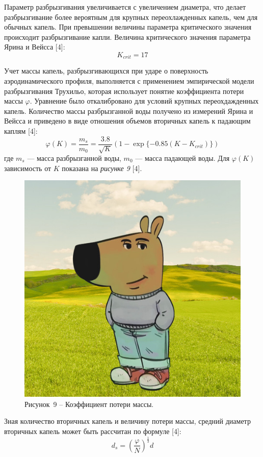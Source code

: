 Параметр разбрызгивания увеличивается с увеличением диаметра, что делает разбрызгивание более вероятным для крупных переохлажденных капель, чем для обычных капель. При превышении величины параметра критического значения происходит разбрызгивание капли. Величина критического значения параметра Ярина и Вейсса [4]:
\begin{equation}
	K_{crit} = 17
\end{equation}

Учет массы капель, разбрызгивающихся при ударе о поверхность аэродинамического профиля, выполняется с применением эмпирической модели разбрызгивания Трухильо, которая использует понятие коэффициента потери массы $\varphi$. Уравнение было откалибровано для условий крупных переохдажденных капель. Количество массы разбрызганной воды получено из измерений Ярина и Вейсса и приведено в виде отношения объемов вторичных капель к падающим каплям [4]: 
\begin{equation}
	\varphi(K) = \frac{m_s}{m_0} = \frac{3.8}{\sqrt{K}}(1-\exp\{-0.85(K-K_{crit})\})
\end{equation}
где $m_s$ --- масса разбрызганной воды, $m_0$ --- масса падающей воды. Для $\varphi(K)$ зависимость от $K$ показана на \textit{рисунке 9} [4].
\begin{figure}[H]
	\centering
	\includegraphics[width=\textwidth]{figures/chill-guy.jpeg}
	\caption*{Рисунок~9 – Коэффициент потери массы.}
	\label{fig:-7}
\end{figure}
Зная количество вторичных капель и величину потери массы, средний диаметр вторичных капель может быть рассчитан по формуле [4]:
\begin{equation}
	d_s = \left(\frac{\varphi}{N}\right)^{\frac{1}{3}}d
\end{equation}

